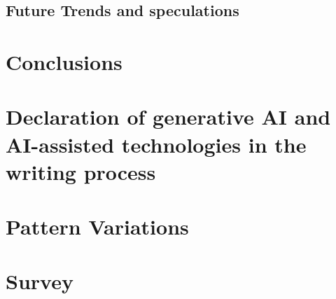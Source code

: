 \documentclass[final,5p,times]{elsarticle}
\begin{document}
\begin{linenumbers}
    \subsection{Future Trends and speculations}
    \label{subsec:Futuretrends}
    

\section{Conclusions}
\label{sec:Conclusion}
%

\section{Declaration of generative AI and AI-assisted technologies in the writing process}
\label{sec:Declaration AI}


\end{linenumbers}

\newpage
\appendix

\section{Pattern Variations}
\label{sec:Variations}


\section{Survey}
\label{sec:Annexsurvey}



\clearpage

    
    
\end{document}
